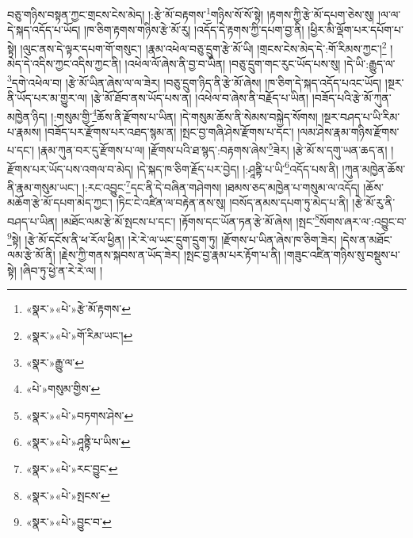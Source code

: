 བཅུ་གཉིས་བསྟན་ཀྱང་གྲངས་ངེས་མེད། །:རྩེ་མོ་བརྟགས་\footnote{«སྣར་»«པེ་»རྩེ་མོ་རྟགས་}གཉིས་སོ་སོ་སྟེ། །རྟགས་ཀྱི་རྩེ་མོ་དཔག་ཅེས་སུ། །ལ་ལ་དེ་སྐད་འདོད་པ་ཡོད། །ཁ་ཅིག་རྟགས་གཉིས་རྩེ་མོ་རུ། །འདོད་དེ་རྟགས་ཀྱི་དཔག་བྱ་ནི། །ཕྱིར་མི་ལྡོག་པར་དཔོག་པ་སྟེ། །ལུང་ནས་དེ་ལྟར་དཔག་གོ་གསུང་། །རྣམ་འཕེལ་བཅུ་དྲུག་རྩེ་མོ་ཡི། །གྲངས་ངེས་མེད་དེ་:གོ་རིམས་ཀྱང་།\footnote{«སྣར་»«པེ་»གོ་རིམ་ཡང་།} །མེད་དེ་འདིས་ཀྱང་འདིས་ཀྱང་ནི། །འཕེལ་ལོ་ཞེས་ནི་བྱ་བ་ཡིན། །བཅུ་དྲུག་གང་རུང་ཡོད་པས་སུ། །དེ་ཡི་:རྒྱུད་ལ་\footnote{«སྣར་»རྒྱུ་ལ་}དགེ་འཕེལ་བ། །རྩེ་མོ་ཡིན་ཞེས་ལ་ལ་ཟེར། །བཅུ་དྲུག་ཉིད་ནི་རྩེ་མོ་ཞེས། །ཁ་ཅིག་དེ་སྐད་འདོད་པའང་ཡོད། །སྔར་ནི་ཡོད་པར་མ་གྱུར་ལ། །རྩེ་མོ་ཐོབ་ནས་ཡོད་པས་ན། །འཕེལ་བ་ཞེས་ནི་བརྗོད་པ་ཡིན། །བཟོད་པའི་རྩེ་མོ་ཀུན་མཁྱེན་ཉིད། །:གསུམ་གྱི་\footnote{«པེ་»གསུམ་གྱིས་}ཆོས་ནི་རྫོགས་པ་ཡིན། །དེ་གསུམ་ཆོས་ནི་སེམས་བསྐྱེད་སོགས། །སྔར་བཤད་པ་ཡི་རིམ་པ་རྣམས། །བཟོད་པར་རྫོགས་པར་འཐད་སྙམ་ན། །སྤང་བྱ་གཞི་ཤེས་རྫོགས་པ་དང་། །ལམ་ཤེས་རྣམ་གཉིས་རྫོགས་པ་དང་། །རྣམ་ཀུན་བར་དུ་རྫོགས་པ་ལ། །རྫོགས་པའི་ཐ་སྙད་:བརྟགས་ཞེས་\footnote{«སྣར་»«པེ་»བཏགས་ཤེས་}ཟེར། །རྩེ་མོ་ས་དགུ་ཡན་ཆད་ན། །རྫོགས་པར་ཡོད་པས་འགལ་བ་མེད། །དེ་སྐད་ཁ་ཅིག་རྗོད་པར་བྱེད། །:ཤཱནྟི་པ་ཡི་\footnote{«སྣར་»«པེ་»ཤཱནྟི་པ་ཡིས་}འདོད་པས་ནི། །ཀུན་མཁྱེན་ཆོས་ནི་རྣམ་གསུམ་ཡང་། །:རང་འབྱུང་\footnote{«སྣར་»«པེ་»རང་བྱུང་}དང་ནི་དེ་བཞིན་གཤེགས། །ཐམས་ཅད་མཁྱེན་པ་གསུམ་ལ་འདོད། །ཆོས་མཆོག་རྩེ་མོ་དཔག་མེད་ཀྱང་། །ཏིང་ངེ་འཛིན་ལ་བརྟེན་ནས་སུ། །བསོད་ནམས་དཔག་ཏུ་མེད་པ་ནི། །རྩེ་མོ་རུ་ནི་བཤད་པ་ཡིན། །མཐོང་ལམ་རྩེ་མོ་སྤངས་པ་དང་། །རྟོགས་དང་ཡོན་ཏན་རྩེ་མོ་ཞེས། །སྤང་\footnote{«སྣར་»«པེ་»སྤངས་}སོགས་ཞར་ལ་:འབྱུང་བ་\footnote{«སྣར་»«པེ་»བྱུང་བ་}སྟེ། །རྩེ་མོ་དངོས་ནི་ཕ་རོལ་ཕྱིན། །རེ་རེ་ལ་ཡང་དྲུག་དྲུག་ཏུ། །རྫོགས་པ་ཡིན་ཞེས་ཁ་ཅིག་ཟེར། །དེས་ན་མཐོང་ལམ་རྩེ་མོ་ནི། །རྗེས་ཀྱི་གནས་སྐབས་ན་ཡོད་ཟེར། །སྤང་བྱ་རྣམ་པར་རྟོག་པ་ནི། །གཟུང་འཛིན་གཉིས་སུ་བསྡུས་པ་སྟེ། །ཞིབ་ཏུ་ཕྱེ་ན་རེ་རེ་ལ། །
